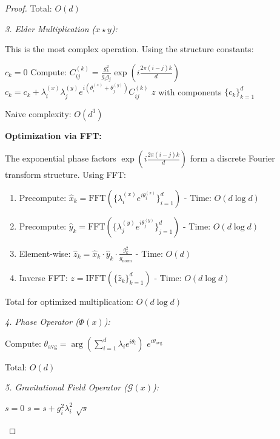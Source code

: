\begin{proof}
Total: $O(d)$

\textit{3. Elder Multiplication ($x \star y$):}

This is the most complex operation. Using the structure constants:
\begin{algorithmic}[1]
        \State $c_k = 0$
                \State Compute: $C_{ij}^{(k)} = \frac{g_k^2}{g_i g_j} \exp(i\frac{2\pi(i-j)k}{d})$
                \State $c_k = c_k + \lambda_i^{(x)} \lambda_j^{(y)} e^{i(\theta_i^{(x)} + \theta_j^{(y)})} C_{ij}^{(k)}$
            \EndFor
        \EndFor
    \EndFor
    \State \Return $z$ with components $\{c_k\}_{k=1}^d$
\EndProcedure
\end{algorithmic}

Naive complexity: $O(d^3)$

\textbf{Optimization via FFT:}

The exponential phase factors $\exp(i\frac{2\pi(i-j)k}{d})$ form a discrete Fourier transform structure. Using FFT:

\begin{enumerate}
\item Precompute: $\hat{x}_k = \text{FFT}(\{\lambda_i^{(x)} e^{i\theta_i^{(x)}}\}_{i=1}^d)$ - Time: $O(d \log d)$
\item Precompute: $\hat{y}_k = \text{FFT}(\{\lambda_j^{(y)} e^{i\theta_j^{(y)}}\}_{j=1}^d)$ - Time: $O(d \log d)$
\item Element-wise: $\hat{z}_k = \hat{x}_k \cdot \hat{y}_k \cdot \frac{g_k^2}{g_{\text{norm}}}$ - Time: $O(d)$
\item Inverse FFT: $z = \text{IFFT}(\{\hat{z}_k\}_{k=1}^d)$ - Time: $O(d \log d)$
\end{enumerate}

Total for optimized multiplication: $O(d \log d)$

\textit{4. Phase Operator ($\Phi(x)$):}
\begin{algorithmic}[1]
    \State Compute: $\theta_{\text{avg}} = \arg\left(\sum_{i=1}^d \lambda_i e^{i\theta_i}\right)$
    \State \Return $e^{i\theta_{\text{avg}}}$
\EndProcedure
\end{algorithmic}

Total: $O(d)$

\textit{5. Gravitational Field Operator ($\mathcal{G}(x)$):}
\begin{algorithmic}[1]
    \State $s = 0$
        \State $s = s + g_i^2 \lambda_i^2$
    \EndFor
    \State \Return $\sqrt{s}$
\EndProcedure
\end{algorithmic}


\end{proof}
